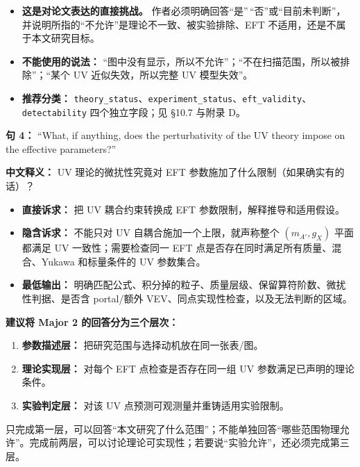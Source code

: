 \documentclass[
  chinese,
  UTF8]{ctexart}
\providecommand{\tightlist}{%
  \setlength{\itemsep}{0pt}\setlength{\parskip}{0pt}}
\begin{document}
\begin{itemize}
\tightlist
\item
  \textbf{这是对论文表达的直接挑战。}
  作者必须明确回答``是''\,``否''或``目前未判断''，并说明所指的``不允许''是理论不一致、被实验排除、EFT
  不适用，还是不属于本文研究目标。
\item
  \textbf{不能使用的说法：}
  ``图中没有显示，所以不允许''；``不在扫描范围，所以被排除''；``某个 UV
  近似失效，所以完整 UV 模型失效''。
\item
  \textbf{推荐分类：}
  \texttt{theory\_status}、\texttt{experiment\_status}、\texttt{eft\_validity}、\texttt{detectability}
  四个独立字段；见 §10.7 与附录 D。
\end{itemize}

\textbf{句 4：} ``What, if anything, does the perturbativity of the UV
theory impose on the effective parameters?''

\textbf{中文释义：} UV 理论的微扰性究竟对 EFT
参数施加了什么限制（如果确实有的话）？

\begin{itemize}
\tightlist
\item
  \textbf{直接诉求：} 把 UV 耦合约束转换成 EFT
  参数限制，解释推导和适用假设。
\item
  \textbf{隐含诉求：} 不能只对 UV 自耦合施加一个上限，就声称整个
  \((m_{A'},g_X)\) 平面都满足 UV 一致性；需要检查同一 EFT
  点是否存在同时满足所有质量、混合、Yukawa 和标量条件的 UV 参数集合。
\item
  \textbf{最低输出：}
  明确匹配公式、积分掉的粒子、质量层级、保留算符阶数、微扰性判据、是否含
  portal/额外 VEV、同点实现性检查，以及无法判断的区域。
\end{itemize}

\textbf{建议将 Major 2 的回答分为三个层次：}

\begin{enumerate}
\def\labelenumi{\arabic{enumi}.}
\tightlist
\item
  \textbf{参数描述层：} 把研究范围与选择动机放在同一张表/图。
\item
  \textbf{理论实现层：} 对每个 EFT 点检查是否存在同一组 UV
  参数满足已声明的理论条件。
\item
  \textbf{实验判定层：} 对该 UV 点预测可观测量并重铸适用实验限制。
\end{enumerate}

只完成第一层，可以回答``本文研究了什么范围''；不能单独回答``哪些范围物理允许''。完成前两层，可以讨论理论可实现性；若要说``实验允许''，还必须完成第三层。
\end{document}
